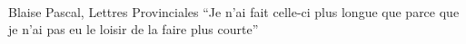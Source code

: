 \pagestyle{empty}
\begin{fullwidth}
    ~\vfill
    \begin{center}
        \large
        \begin{minipage}{0.5\linewidth}
            \begin{epigram}{Blaise Pascal, Lettres Provinciales}
                \enquote{Je n’ai fait celle-ci plus longue que parce que je n’ai pas eu le loisir de la faire plus courte}
            \end{epigram}
        \end{minipage}
    \end{center}
    ~\vfill
\end{fullwidth}
